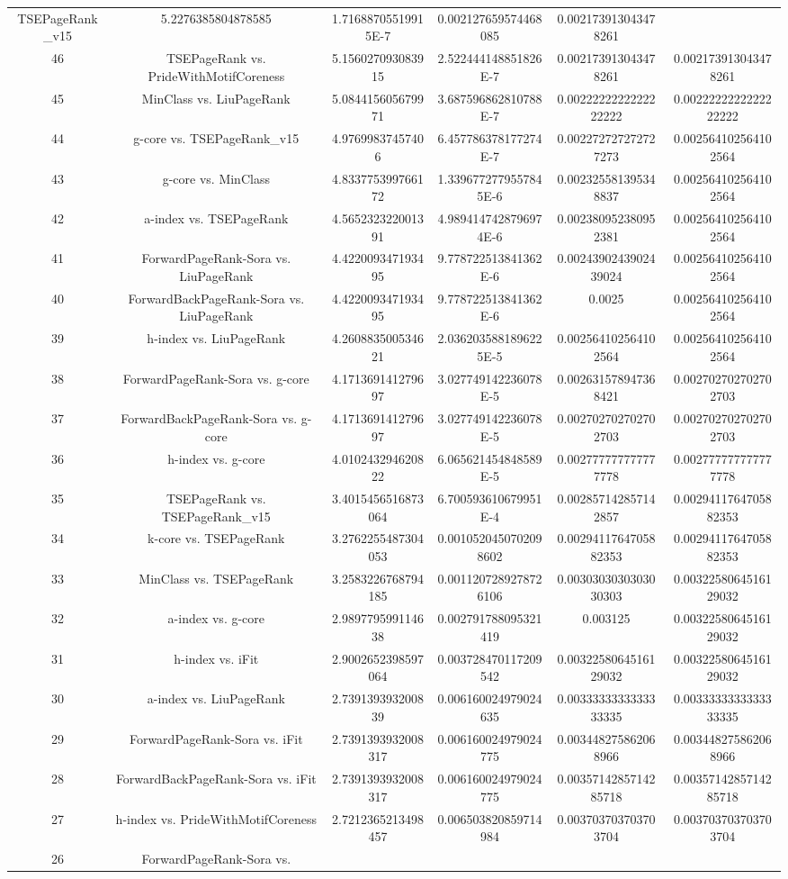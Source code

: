 \documentclass[a4paper,10pt]{article}
\begin{document}
\begin{landscape}
\begin{table}[!htp]
\begin{tabular}{cccccc}
TSEPageRank_v15&5.2276385804878585&1.71688705519915E-7&0.002127659574468085&0.002173913043478261\\46&TSEPageRank vs. PrideWithMotifCoreness&5.156027093083915&2.522444148851826E-7&0.002173913043478261&0.002173913043478261\\45&MinClass vs. LiuPageRank&5.084415605679971&3.687596862810788E-7&0.0022222222222222222&0.0022222222222222222\\44&g-core vs. TSEPageRank_v15&4.97699837457406&6.457786378177274E-7&0.002272727272727273&0.002564102564102564\\43&g-core vs. MinClass&4.833775399766172&1.3396772779557845E-6&0.002325581395348837&0.002564102564102564\\42&a-index vs. TSEPageRank&4.565232322001391&4.9894147428796974E-6&0.002380952380952381&0.002564102564102564\\41&ForwardPageRank-Sora vs. LiuPageRank&4.422009347193495&9.778722513841362E-6&0.0024390243902439024&0.002564102564102564\\40&ForwardBackPageRank-Sora vs. LiuPageRank&4.422009347193495&9.778722513841362E-6&0.0025&0.002564102564102564\\39&h-index vs. LiuPageRank&4.260883500534621&2.0362035881896225E-5&0.002564102564102564&0.002564102564102564\\38&ForwardPageRank-Sora vs. g-core&4.171369141279697&3.027749142236078E-5&0.002631578947368421&0.002702702702702703\\37&ForwardBackPageRank-Sora vs. g-core&4.171369141279697&3.027749142236078E-5&0.002702702702702703&0.002702702702702703\\36&h-index vs. g-core&4.010243294620822&6.065621454848589E-5&0.002777777777777778&0.002777777777777778\\35&TSEPageRank vs. TSEPageRank_v15&3.4015456516873064&6.700593610679951E-4&0.002857142857142857&0.0029411764705882353\\34&k-core vs. TSEPageRank&3.2762255487304053&0.0010520450702098602&0.0029411764705882353&0.0029411764705882353\\33&MinClass vs. TSEPageRank&3.2583226768794185&0.0011207289278726106&0.0030303030303030303&0.0032258064516129032\\32&a-index vs. g-core&2.989779599114638&0.002791788095321419&0.003125&0.0032258064516129032\\31&h-index vs. iFit&2.9002652398597064&0.003728470117209542&0.0032258064516129032&0.0032258064516129032\\30&a-index vs. LiuPageRank&2.739139393200839&0.006160024979024635&0.0033333333333333335&0.0033333333333333335\\29&ForwardPageRank-Sora vs. iFit&2.7391393932008317&0.006160024979024775&0.003448275862068966&0.003448275862068966\\28&ForwardBackPageRank-Sora vs. iFit&2.7391393932008317&0.006160024979024775&0.0035714285714285718&0.0035714285714285718\\27&h-index vs. PrideWithMotifCoreness&2.7212365213498457&0.006503820859714984&0.003703703703703704&0.003703703703703704\\26&ForwardPageRank-Sora vs. 
\end{tabular}
\end{table}
\end{landscape}
\end{document}
